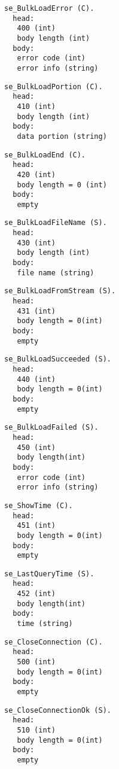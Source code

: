 \documentclass[a4paper,12pt]{article}
\begin{document}
\begin{verbatim}
se_BulkLoadError (C).
  head:
   400 (int)
   body length (int)
  body:
   error code (int)
   error info (string)
\end{verbatim}

\begin{verbatim}
se_BulkLoadPortion (C).
  head:
   410 (int)
   body length (int)
  body:
   data portion (string)
\end{verbatim}

\begin{verbatim}
se_BulkLoadEnd (C).
  head:
   420 (int)
   body length = 0 (int)
  body:
   empty
\end{verbatim}

\begin{verbatim}
se_BulkLoadFileName (S).
  head:
   430 (int)
   body length (int)
  body:
   file name (string)
\end{verbatim}

\begin{verbatim}
se_BulkLoadFromStream (S).
  head:
   431 (int)
   body length = 0(int)
  body:
   empty
\end{verbatim}

\begin{verbatim}
se_BulkLoadSucceeded (S).
  head:
   440 (int)
   body length = 0(int)
  body:
   empty
\end{verbatim}

\begin{verbatim}
se_BulkLoadFailed (S).
  head:
   450 (int)
   body length(int)
  body:
   error code (int)
   error info (string)
\end{verbatim}

\begin{verbatim}
se_ShowTime (C).
  head:
   451 (int)
   body length = 0(int)
  body:
   empty
\end{verbatim}

\begin{verbatim}
se_LastQueryTime (S).
  head:
   452 (int)
   body length(int)
  body:
   time (string)
\end{verbatim}

\begin{verbatim}
se_CloseConnection (C).
  head:
   500 (int)
   body length = 0(int)
  body:
   empty
\end{verbatim}

\begin{verbatim}
se_CloseConnectionOk (S).
  head:
   510 (int)
   body length = 0(int)
  body:
   empty
\end{verbatim}
\end{document}
